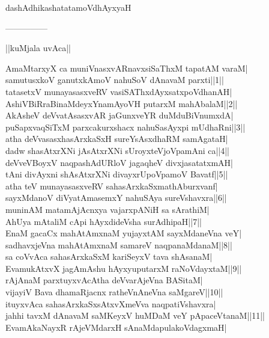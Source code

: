 \documentclass{article}
\begin{document}
\begin{center}
dashAdhikashatatamoVdhAyxyaH
\end{center}

\begin{center}
---------------
\end{center}

\begin{center}
||kuMjala uvAca||
\end{center}

AmaMtarxyX ca muniVnasxvARnavxsiSaThxM tapatAM varaM|\\
samutusxkoV ganutxkAmoV nahuSoV dAnavaM parxti||1||\\
tatasetxV munayasasxveRV vasiSAThxdAyxsatxpoVdhanAH|\\
AshiVBiRraBinaMdeyxYnamAyoVH putarxM mahAbalaM||2||\\
AkAsheV deVvatAsasxvAR jaGunxveYR duMduBiVnumxdA|\\
puSapxvaqSiTxM parxcakurxshacx nahuSasAyxpi mUdhaRni||3||\\
atha deVvasasxhasArxkaSxH sureYsAsxdhaRM samAgataH|\\
dadw shasAtxrXNi jAsAtxrXNi sUroyxteVjoVpamAni ca||4||\\
deVveVBoyxV naqpashAdURloV jagaqheV divxjasatatxmAH|\\
tAni divAyxni shAsAtxrXNi divayxrUpoVpamoV Bavatf||5||\\
atha teV munayasasxveRV sahasArxkaSxmathAburxvanf|\\
sayxMdanoV diVyatAmasemxY nahuSAya sureVshavxra||6||\\
muninAM matamAjAcnxya vajarxpANiH sa sArathiM|\\
AhUya mAtaliM cApi hAyxdideVsha surAdhipaH||7||\\
EnaM gacaCx mahAtAmxnaM yujayxtAM sayxMdaneVna veY|\\
sadhavxjeVna mahAtAmxnaM samareV naqpanaMdanaM||8||\\
sa coVvAca sahasArxkaSxM kariSeyxV tava shAsanaM|\\
EvamukAtxvX jagAmAshu hAyxyuputarxM raNoVdayxtaM||9||\\
rAjAnaM parxtuyxvAcAtha deVvarAjeVna BASitaM|\\
vijayiV Bava dhamaRjacnx ratheVnAneVna saMgareV||10||\\
ituyxvAca sahasArxkaSxsAtxvXmeVva naqpatiVshavxra|\\
jahhi tavxM dAnavaM saMKeyxV huMDaM veY pApaceVtanaM||11||\\
EvamAkaNayxR rAjeVMdarxH sAnaMdapulakoVdagxmaH|\\
\end{document}
